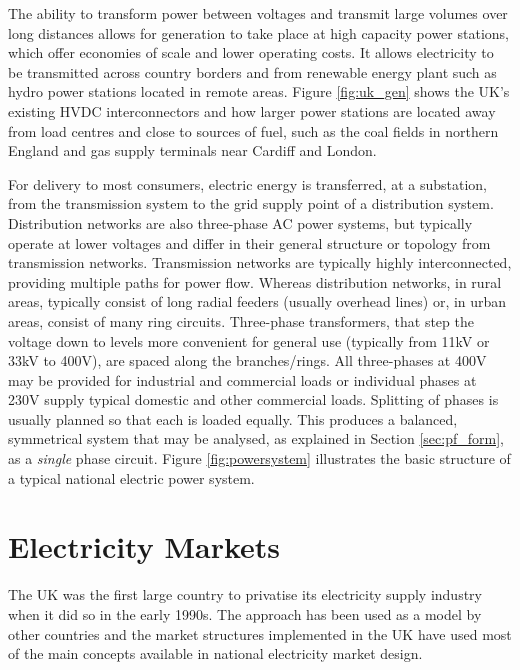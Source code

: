 The ability to transform power between voltages and
transmit large volumes over long distances allows for generation to take place at high capacity power stations, which offer economies of scale and lower operating costs. It allows electricity to
be transmitted across country borders and from renewable energy plant such as
hydro power stations located in remote areas.
Figure \ref{fig:uk_gen} shows the UK's existing HVDC interconnectors and
how larger power stations are located away from load centres and close to
sources of fuel, such as the coal fields in northern England and gas supply
terminals near Cardiff and London.


For delivery to most consumers, electric energy is transferred, at a
substation, from the transmission system to the grid supply point of a distribution
system.  Distribution networks are also three-phase AC power systems, but
typically operate at lower voltages and differ in their general
structure or topology from transmission networks.  Transmission networks are
typically highly interconnected, providing multiple paths for power flow.
Whereas distribution networks, in rural areas, typically consist of long radial
feeders (usually overhead lines) or, in urban areas, consist of many ring
circuits.  Three-phase transformers, that step the voltage down to levels
more convenient for general use (typically from 11kV or 33kV to 400V), are
spaced along the branches/rings. All three-phases at 400V may be provided for
industrial and commercial loads or individual phases at 230V supply typical
domestic and other commercial loads. Splitting of phases is usually planned so
that each is loaded equally. This produces a balanced, symmetrical system that
may be analysed, as explained in Section \ref{sec:pf_form}, as a
\textit{single} phase circuit.  Figure \ref{fig:powersystem} illustrates the
basic structure of a typical national electric power system.

\section{Electricity Markets}
The UK was the first large country to privatise its electricity supply industry
when it did so in the early 1990s.  The approach has been used as a model
by other countries and the market structures implemented in the UK have used
most of the main concepts available in national electricity market design.

